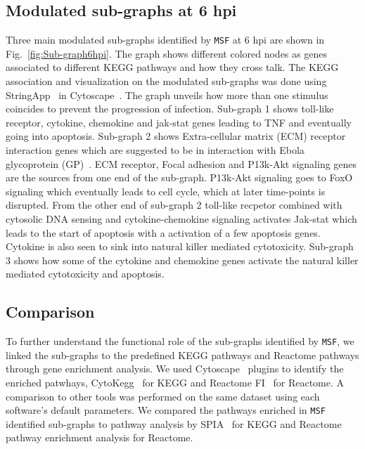 \documentclass[10pt,a4paper,twocolumn]{article}
\begin{document}
\subsection*{Modulated sub-graphs at 6 hpi}

 Three main modulated sub-graphs identified by \texttt{MSF} at 6 hpi
 are shown in Fig.~\ref{fig:Sub-graph6hpi}. The graph shows different colored nodes as
 genes associated to different KEGG pathways and how they cross talk. The KEGG
 association and visualization on the modulated sub-graphs was done
 using StringApp~\cite{StringApp} in Cytoscape~\cite{Cyto}. The graph
 unveils how more than one stimulus coincides to prevent the
 progression of infection. Sub-graph 1 shows toll-like receptor,
 cytokine, chemokine and jak-stat genes leading to TNF and eventually
 going into apoptosis. Sub-graph 2 shows Extra-cellular matrix (ECM)
 receptor interaction genes which are suggested to be in interaction
 with Ebola glycoprotein (GP)~\cite{Veljkovic}. ECM receptor, Focal
 adhesion and P13k-Akt signaling genes are the sources from one end of
 the sub-graph. P13k-Akt signaling goes to FoxO signaling which
 eventually leads to cell cycle, which at later time-points is
 disrupted. From the other end of sub-graph 2 toll-like recpetor
 combined with cytosolic DNA sensing and cytokine-chemokine signaling
 activates Jak-stat which leads to the start of apoptosis with a
 activation of a few apoptosis genes. Cytokine is also seen to sink
 into natural killer mediated cytotoxicity. Sub-graph 3 shows how some
 of the cytokine and chemokine genes activate the natural killer
 mediated cytotoxicity and apoptosis.



\subsection*{Comparison}

To further understand the functional role of the sub-graphs identified
by \texttt{MSF}, we linked the sub-graphs to the predefined KEGG
pathways and Reactome pathways through gene enrichment analysis. We
used Cytoscape~\cite{Cyto} plugins to identify the enriched patwhays,
CytoKegg~\cite{Cytokegg} for KEGG and Reactome FI~\cite{Reactome} for
Reactome. A comparison to other tools was performed on the same dataset using each software's default parameters. We compared the pathways enriched in \texttt{MSF} identified
sub-graphs to pathway analysis by SPIA~\cite{Tarca} for KEGG and
Reactome pathway enrichment analysis for Reactome.
\end{document}
